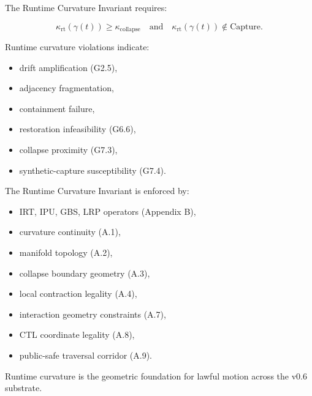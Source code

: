 \medskip

\noindent The Runtime Curvature Invariant requires:



\[
\kappa_{\mathrm{rt}}(\gamma(t)) \ge \kappa_{\mathrm{collapse}}
\quad \text{and} \quad
\kappa_{\mathrm{rt}}(\gamma(t)) \notin \text{Capture}.
\]



\medskip

\noindent Runtime curvature violations indicate:

\begin{itemize}
    \item drift amplification (G2.5),
    \item adjacency fragmentation,
    \item containment failure,
    \item restoration infeasibility (G6.6),
    \item collapse proximity (G7.3),
    \item synthetic-capture susceptibility (G7.4).
\end{itemize}

\medskip

\noindent The Runtime Curvature Invariant is enforced by:

\begin{itemize}
    \item IRT, IPU, GBS, LRP operators (Appendix B),
    \item curvature continuity (A.1),
    \item manifold topology (A.2),
    \item collapse boundary geometry (A.3),
    \item local contraction legality (A.4),
    \item interaction geometry constraints (A.7),
    \item CTL coordinate legality (A.8),
    \item public-safe traversal corridor (A.9).
\end{itemize}

\medskip

\noindent Runtime curvature is the geometric foundation for lawful motion across
the v0.6 substrate.



